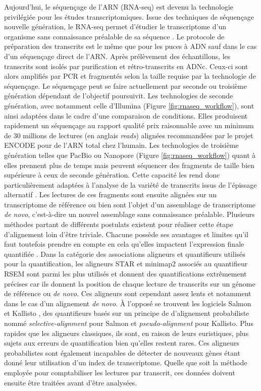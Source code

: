Aujourd'hui, le séquençage de l'ARN (RNA-seq) est devenu la technologie privilégiée pour les études transcriptomiques. Issue des techniques de séquençage nouvelle génération, le RNA-seq permet d'étudier le transcriptome d'un organisme sans connaissance préalable de sa séquence \cite{Wang2009Jan}. Le protocole de préparation des transcrits est le même que pour les puces à ADN sauf dans le cas d'un séquençage direct de l'ARN. Après prélèvement des échantillons, les transcrits sont isolés par purification et rétro-transcrits en ADNc. Ceux-ci sont alors amplifiés par PCR et fragmentés selon la taille requise par la technologie de séquençage. Le séquençage peut se faire actuellement par seconde ou troisième génération dépendant de l'objectif poursuivit. Les technologies de seconde génération, avec notamment celle d'Illumina (Figure \ref{fig:rnaseq_workflow}), sont ainsi adaptées dans le cadre d'une comparaison de conditions. Elles produisent rapidement un séquençage au rapport qualité prix raisonnable avec un minimum de 30 millions de lectures (en anglais \textit{reads}) alignées recommandées par le projet ENCODE \cite{ENCODE2012} pour de l'ARN total chez l'humain. Les technologies de troisième génération telles que PacBio ou Nanopore (Figure \ref{fig:rnaseq_workflow}) quant à elles prennent plus de temps mais peuvent séquencer des fragments de taille bien supérieure à ceux de seconde génération. Cette capacité les rend donc particulièrement adaptées à l'analyse de la variété de transcrits issus de l'épissage alternatif \cite{Bergsma2018Jan}. Les lectures de ces fragments sont ensuite alignées sur un transcriptome de référence ou bien sont l'objet d'un assemblage de transcriptome \textit{de novo}, c’est-à-dire un nouvel assemblage sans connaissance préalable. Plusieurs méthodes partant de différents postulats existent pour réaliser cette étape d'alignement loin d'être triviale. Chacune possède ses avantages et limites qu'il faut toutefois prendre en compte en cela qu'elles impactent l'expression finale quantifiée \cite{Yi2018Oct,Srivastava2020Dec}. Dans la catégorie des associations aligneurs et quantifieurs utilisés pour la quantification, les aligneurs STAR \cite{Dobin2013Jan} et minimap2 \cite{Li2018Sep} associés au quantifieur RSEM \cite{Li2011Dec} sont parmi les plus utilisés et donnent des quantifications extrêmement précises car ils donnent la position de chaque lecture de transcrits sur un génome de référence ou \textit{de novo}. Ces aligneurs sont cependant assez lents et notamment dans le cas d'un alignement \textit{de novo}. À l'opposé se trouvent les logiciels Salmon \cite{Patro2017Apr} et Kallisto \cite{Bray2016May}, des quantifieurs basés sur un principe de d'alignement probabiliste nommé \textit{selective-alignment} pour Salmon et \textit{pseudo-alignment} pour Kallisto. Plus rapides que les aligneurs classiques, ils sont, en raison de leurs euristiques, plus sujets aux erreurs de quantification bien qu'elles restent rares. Ces aligneurs probabilistes sont également incapables de détecter de nouveaux gènes étant donné leur utilisation d'un index de transcriptome. Quelle que soit la méthode employée pour comptabiliser les lectures par transcrit, ces données doivent ensuite être traitées avant d'être analysées.


